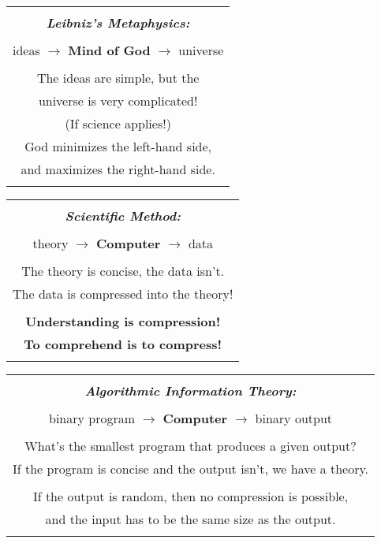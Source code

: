 \documentclass[12pt]{book}
\begin{document}
\begin{center}
\begin{tabular}{|c|}
\hline
\\
\textbf{\emph{\large Leibniz's Metaphysics:}}
\\ \\
ideas $\longrightarrow$ \textbf{\large Mind of God} $\longrightarrow$ universe
\\ \\
The ideas are simple, but the 
\\
universe is very complicated!
\\
(If science applies!)
\\
God minimizes the left-hand side,
\\
and maximizes the right-hand side.
\\
\\
\hline
\end{tabular}
\end{center}
 
\begin{center}
\begin{tabular}{|c|}
\hline
\\
\textbf{\emph{\large Scientific Method:}}
\\ \\
theory $\longrightarrow$ \textbf{\large Computer} $\longrightarrow$ data
\\ \\
The theory is concise, the data isn't.
\\
The data is compressed into the theory!
\\ \\
\textbf{Understanding is compression!}
\\
\textbf{To comprehend is to compress!}
\\
\\
\hline
\end{tabular}
\end{center}
 
\begin{center}
\begin{tabular}{|c|}
\hline
\\
\textbf{\emph{\large Algorithmic Information Theory:}}
\\ \\
binary program $\longrightarrow$ \textbf{\large Computer} $\longrightarrow$ binary output 
\\ \\
What's the smallest program that produces a given output?
\\
If the program is concise and the output isn't, we have a theory.
\\ \\
If the output is random, then no compression is possible,
\\
and the input has to be the same size as the output.
\\
\\
\hline
\end{tabular}
\end{center}
 
\end{document}
